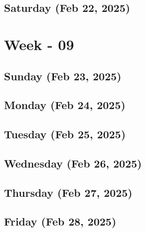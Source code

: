 \subsection*{Saturday (Feb 22, 2025)}

\section{Week - 09}
\subsection*{Sunday (Feb 23, 2025)}
\subsection*{Monday (Feb 24, 2025)}
\subsection*{Tuesday (Feb 25, 2025)}
\subsection*{Wednesday (Feb 26, 2025)}
\subsection*{Thursday (Feb 27, 2025)}
\subsection*{Friday (Feb 28, 2025)}

\newpage
\begin{spacing}{1.0}
\renewcommand{\bibname}{\bf{References}}


\end{spacing}
